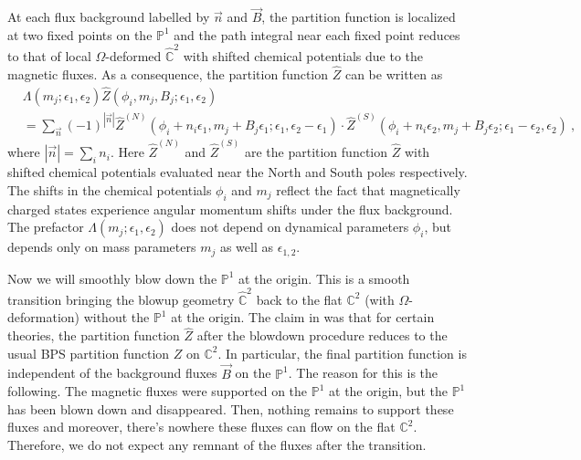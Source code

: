 At each flux background labelled by $\vec{n}$ and $\vec{B}$, the partition function is localized at two fixed points on the $\mathbb{P}^1$ and the path integral near each fixed point reduces to that of local $\Omega$-deformed $\hat{\mathbb{C}}^2$ with shifted chemical potentials due to the magnetic fluxes. As a consequence, the partition function $\hat{Z}$ can be written as \cite{Nakajima:2003pg,Nakajima:2005fg,Gottsche:2006bm}
\begin{align}\label{eq:bleq}
&\Lambda(m_j;\epsilon_1,\epsilon_2)\hat{Z}(\phi_i, m_j,B_j; \epsilon_1,\epsilon_2)  \\
&=\sum_{\vec{n}}(-1)^{|\vec{n}|}\hat{Z}^{(N)}(\phi_i\!+\!n_i\epsilon_1,m_j\!+\!B_j\epsilon_1;\epsilon_1,\epsilon_2\!-\!\epsilon_1) \cdot \hat{Z}^{(S)}(\phi_i\!+\!n_i\epsilon_2,m_j\!+\!B_j\epsilon_2;\epsilon_1\!-\!\epsilon_2,\epsilon_2)\ , \nonumber
\end{align}
where $|\vec{n}|=\sum_i n_i$. Here $\hat{Z}^{(N)}$ and $\hat{Z}^{(S)}$ are the partition function $\hat{Z}$ with shifted chemical potentials evaluated near the North and South poles respectively. The shifts in the chemical potentials $\phi_i$ and $m_j$ reflect the fact that magnetically charged states experience angular momentum shifts under the flux background. The prefactor $\Lambda(m_j;\epsilon_1,\epsilon_2)$ does not depend on dynamical parameters $\phi_i$, but depends only on mass parameters $m_j$ as well as $\epsilon_{1,2}$.

Now we will smoothly blow down the $\mathbb{P}^1$ at the origin. This is a smooth transition bringing the blowup geometry $\hat{\mathbb{C}}^2$ back to the flat $\mathbb{C}^2$ (with $\Omega$-deformation) without the $\mathbb{P}^1$ at the origin. The claim in \cite{Nakajima:2003pg} was that for certain theories, the partition function $\hat{Z}$ after the blowdown procedure reduces to the usual BPS partition function $Z$ on $\mathbb{C}^2$. In particular, the final partition function is independent of the background fluxes $\vec{B}$ on the $\mathbb{P}^1$. The reason for this is the following. The magnetic fluxes were supported on the $\mathbb{P}^1$ at the origin, but the $\mathbb{P}^1$ has been blown down and disappeared. Then, nothing remains to support these fluxes and moreover, there's nowhere these fluxes can flow on the flat $\mathbb{C}^2$. Therefore, we do not expect any remnant of the fluxes after the transition. 

